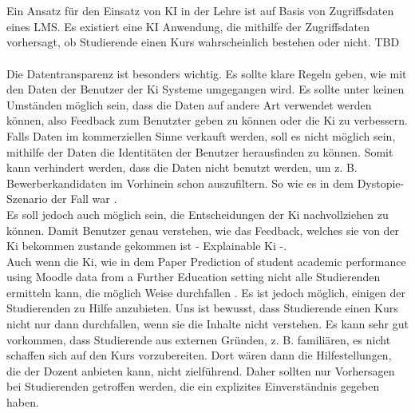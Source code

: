 \\ \noindent
\\ \noindent
Ein Ansatz für den Einsatz von KI in der Lehre ist auf Basis von Zugriffsdaten eines \ac{LMS}.
Es existiert eine KI Anwendung, die mithilfe der Zugriffsdaten vorhersagt, ob Studierende einen Kurs wahrscheinlich bestehen oder nicht. TBD
\\ \noindent
\\ \noindent
Die Datentransparenz ist besonders wichtig.
Es sollte klare Regeln geben, wie mit den Daten der Benutzer der Ki Systeme umgegangen wird.
Es sollte unter keinen Umständen möglich sein, dass die Daten auf andere Art verwendet werden können, also Feedback zum Benutzter geben zu können oder die Ki zu verbessern.
Falls Daten im kommerziellen Sinne verkauft werden, soll es nicht möglich sein, mithilfe der Daten die Identitäten der Benutzer herausfinden zu können.
Somit kann verhindert werden, dass die Daten nicht benutzt werden, um z. B. Bewerberkandidaten im Vorhinein schon auszufiltern.
So wie es in dem Dystopie-Szenario der Fall war \cite[S. 8f]{Pinkwart.2016}. 
\\ \noindent
Es soll jedoch auch möglich sein, die Entscheidungen der Ki nachvollziehen zu können. Damit Benutzer genau verstehen, wie das Feedback, welches sie von der Ki bekommen zustande gekommen ist - Explainable Ki -.
\\ \noindent
Auch wenn die Ki, wie in dem Paper \glqq{} Prediction of student academic performance using Moodle data from a Further Education setting \grqq{} nicht alle Studierenden ermitteln kann, die möglich Weise durchfallen  \cite[S. 16]{Quinn.2020}.
Es ist jedoch möglich, einigen der Studierenden zu Hilfe anzubieten. Uns ist bewusst, dass Studierende einen Kurs nicht nur dann durchfallen, wenn sie die Inhalte nicht verstehen.
Es kann sehr gut vorkommen, dass Studierende aus externen Gründen, z. B. familiären, es nicht schaffen sich auf den Kurs vorzubereiten.
Dort wären dann die Hilfestellungen, die der Dozent anbieten kann, nicht zielführend. Daher sollten nur Vorhersagen bei Studierenden getroffen werden, die ein explizites Einverständnis gegeben haben.